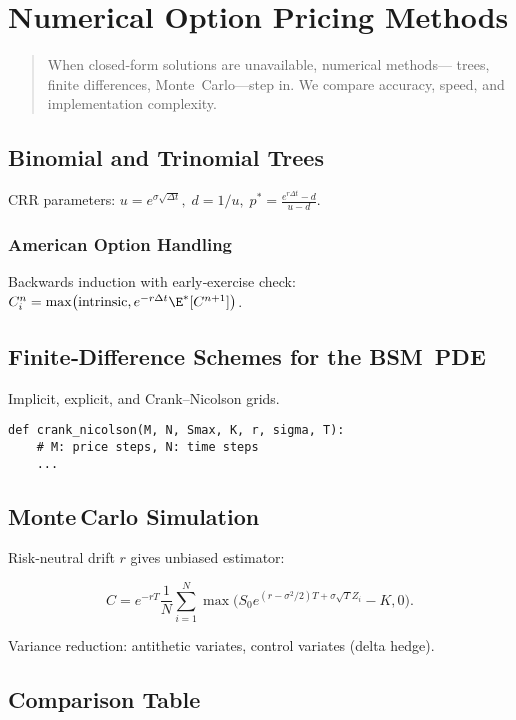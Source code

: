 \chapter{Numerical Option Pricing Methods}\label{ch:numerical}

\begin{abstract}
When closed‑form solutions are unavailable, numerical methods—
trees, finite differences, Monte Carlo—step in.  We compare accuracy,
speed, and implementation complexity.
\end{abstract}

\section{Binomial and Trinomial Trees}

CRR parameters:
\(u=e^{\sigma\sqrt{\Delta t}},\;
 d=1/u,\;
 p^* = \frac{e^{r\Delta t}-d}{u-d}\).

\subsection{American Option Handling}

Backwards induction with early‑exercise check:
\(C_i^n = \max\bigl(\text{intrinsic}, e^{-r\Delta t}\E^* [C^{n+1}]\bigr)\).

\section{Finite‑Difference Schemes for the BSM PDE}

Implicit, explicit, and Crank–Nicolson grids.

\begin{verbatim}
def crank_nicolson(M, N, Smax, K, r, sigma, T):
    # M: price steps, N: time steps
    ...
\end{verbatim}

\section{Monte Carlo Simulation}

Risk‑neutral drift \(r\) gives unbiased estimator:

\[
C = e^{-rT} \frac1{N}\sum_{i=1}^N
            \max\bigl(S_0 e^{(r-\sigma^2/2)T + \sigma\sqrt{T}Z_i}-K,0\bigr).
\]

Variance reduction: antithetic variates, control variates (delta hedge).

\section*{Comparison Table}


